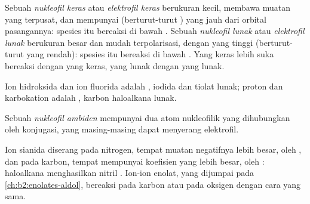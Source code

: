 \begin{definition}\label{def:b2:frontier-orbitals:hard-soft}
Sebuah \emph{nukleofil keras} atau \emph{elektrofil
keras} berukuran kecil, membawa muatan yang
terpusat, dan mempunyai  (berturut-turut ) yang jauh dari orbital
pasangannya: spesies itu bereaksi di bawah . Sebuah
\emph{nukleofil lunak} atau \emph{elektrofil
lunak} berukuran besar dan mudah terpolarisasi,
dengan  yang tinggi (berturut-turut  yang rendah): spesies itu
bereaksi di bawah . Yang keras lebih suka bereaksi dengan
yang keras, yang lunak dengan yang lunak.
\end{definition}

Ion hidroksida dan ion fluorida adalah , iodida dan tiolat
lunak; proton dan karbokation adalah , karbon haloalkana
lunak.

\begin{definition}\label{def:b2:frontier-orbitals:ambident}
Sebuah \emph{nukleofil ambiden} mempunyai dua atom
nukleofilik yang dihubungkan oleh konjugasi, yang masing-masing dapat
menyerang elektrofil.
\end{definition}

Ion sianida diserang pada nitrogen, tempat muatan negatifnya lebih besar,
oleh , dan pada karbon, tempat  mempunyai koefisien
yang lebih besar, oleh : haloalkana menghasilkan nitril
. Ion-ion enolat, yang dijumpai pada \cref{ch:b2:enolates-aldol},
bereaksi pada karbon atau pada oksigen dengan cara yang sama.

